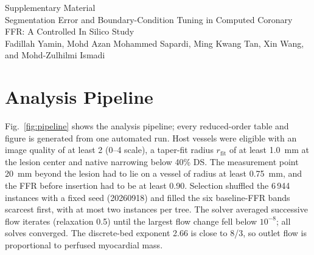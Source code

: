 \documentclass[journal,twoside,web,onecolumn]{ieeecolor}
\begin{document}
\sloppy
\pagestyle{plain}
\begin{center}
{\large Supplementary Material}\\[3pt]
{\small Segmentation Error and Boundary-Condition Tuning in Computed Coronary FFR: A Controlled In Silico Study}\\[2pt]
{\small Fadillah Yamin, Mohd Azan Mohammed Sapardi, Ming Kwang Tan, Xin Wang, and Mohd-Zulhilmi Ismadi}
\end{center}
\vspace{2pt}

\section{Analysis Pipeline}
Fig.~\ref{fig:pipeline} shows the analysis pipeline; every reduced-order table and figure is generated from one
automated run. Host vessels were eligible with an image quality of at least 2 (0--4 scale), a taper-fit radius
$r_\mathrm{fit}$ of at least 1.0~mm at the lesion center and native narrowing below 40\% DS. The measurement point
20~mm beyond the lesion had to lie on a vessel of radius at least 0.75~mm, and the FFR before insertion had to be at
least 0.90. Selection
shuffled the 6\,944 instances with a fixed seed (20260918) and filled the six baseline-FFR bands scarcest first, with
at most two instances per tree. The solver averaged successive flow iterates (relaxation 0.5) until the largest flow
change fell below $10^{-8}$; all solves converged. The discrete-bed exponent 2.66 is close to 8/3, so outlet flow is
proportional to perfused myocardial mass.
\end{document}
